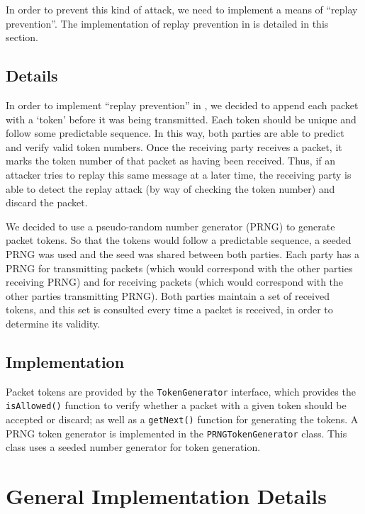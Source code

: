 \documentclass[a4paper,11pt]{article}
\begin{document}
In order to prevent this kind of attack, we need to implement a means of 
``replay prevention''. The implementation of replay prevention in \packageName{}
is detailed in this section.

\subsection{Details}
In order to implement ``replay prevention'' in \packageName{}, we decided to 
append each packet with a `token' before it was being transmitted. Each token 
should be unique and follow some predictable sequence. In this way, both parties
are able to predict and verify valid token numbers. Once the receiving party 
receives a packet, it marks the token number of that packet as having been 
received. Thus, if an attacker tries to replay this same message at a later 
time, the receiving party is able to detect the replay attack (by way of
checking the token number) and discard the packet.

We decided to use a pseudo-random number generator (PRNG) to generate packet 
tokens. So that the tokens would follow a predictable sequence, a seeded PRNG
was used and the seed was shared between both parties. Each party has a PRNG for
transmitting packets (which would correspond with the other parties receiving 
PRNG) and for receiving packets (which would correspond with the other parties 
transmitting PRNG). Both parties maintain a set of received tokens, and this 
set is consulted every time a packet is received, in order to determine its
validity.

\subsection{Implementation}
Packet tokens are provided by the \verb+TokenGenerator+ interface, which 
provides the \verb+isAllowed()+ function to verify whether a packet with a given
token should be accepted or discard; as well as a \verb+getNext()+ function for
generating the tokens. A PRNG token generator is implemented in the 
\verb+PRNGTokenGenerator+ class. This class uses a seeded number generator for
token generation.

\section{General Implementation Details}
\end{document}
